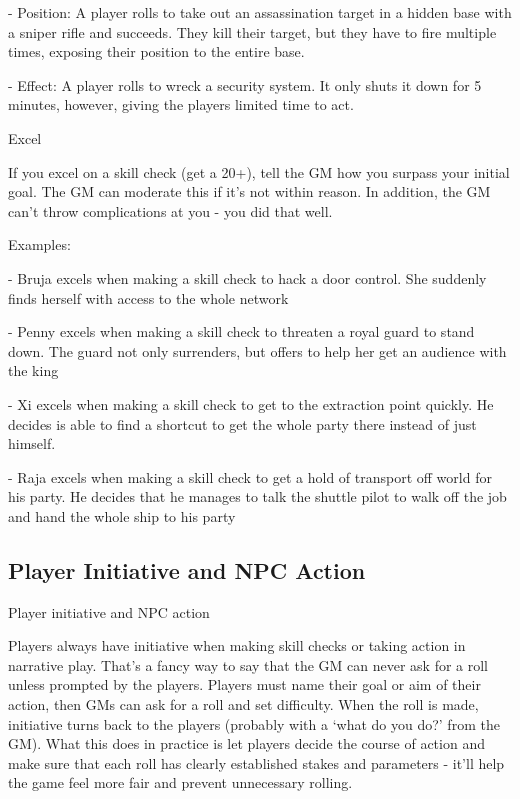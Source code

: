          	- Position: A player rolls to take out an assassination target in a hidden base with a  
         sniper rifle and succeeds. They kill their target, but they have to fire multiple times,  
         exposing their position to the entire base.
 
         	- Effect: A player rolls to wreck a security system. It only shuts it down for 5 minutes,  
         however, giving the players limited time to act.
 

                                                       Excel  

If you excel on a skill check (get a 20+), tell the GM how you surpass your initial goal. The GM  
can moderate this if it’s not within reason. In addition, the GM can’t throw complications at you -  
you did that well.
 

Examples:
 
         	- Bruja excels when making a skill check to hack a door control. She suddenly finds  
         herself with access to the whole network
 
         	- Penny excels when making a skill check to threaten a royal guard to stand down. The  
         guard not only surrenders, but offers to help her get an audience with the king
 

                                                                                                                    


         	- Xi excels when making a skill check to get to the extraction point quickly. He decides  
         is able to find a shortcut to get the whole party there instead of just himself.
 
         - Raja excels when making a skill check to get a hold of transport off world for his party.  
         He decides that he manages to talk the shuttle pilot to walk off the job and hand the  
         whole ship to his party
 
\subsection{Player Initiative and NPC Action}
                                 Player initiative and NPC action
 

Players always have initiative when making skill checks or taking action in narrative play. That’s  
a fancy way to say that the GM can never ask for a roll unless prompted by the players. Players  
must name their goal or aim of their action, then GMs can ask for a roll and set difficulty. When  
the roll is made, initiative turns back to the players (probably with a ‘what do you do?’ from the  
GM). What this does in practice is let players decide the course of action and make sure that  
each roll has clearly established stakes and parameters - it’ll help the game feel more fair and  
prevent unnecessary rolling.
 


